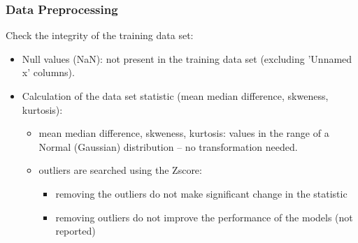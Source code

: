 \begin{frame}
\frametitle{Data Preprocessing}
Check the integrity of the training data set:
\begin{itemize}
    \item Null values (NaN): not present in the training data set (excluding 'Unnamed x' columns).
    \item Calculation of the data set statistic (mean median difference, skweness, kurtosis):
    \begin{itemize}
        \item mean median difference, skweness, kurtosis: values in the range of a Normal (Gaussian) distribution -- no transformation needed.
        \item outliers are searched using the Zscore:
        \begin{itemize}
            \item removing the outliers do not make significant change in the statistic 
            \item removing outliers do not improve the performance of the models (not reported)
        \end{itemize}
    \end{itemize}
    \end{itemize}
\end{frame}
